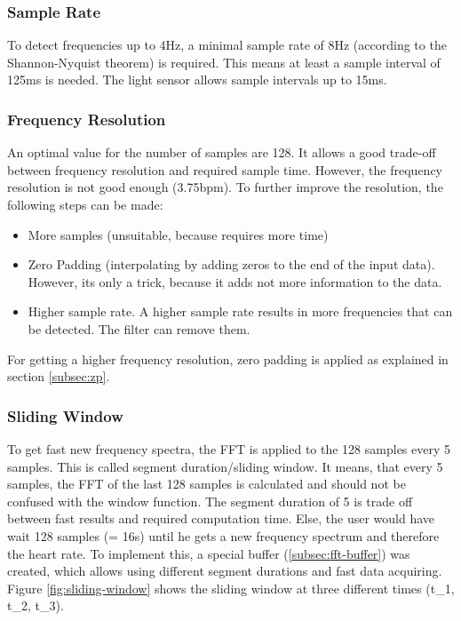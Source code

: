 \documentclass[notitlepage]{scrreprt}
\begin{document}
\subsubsection{Sample Rate}
To detect frequencies up to 4Hz, a minimal sample rate of 8Hz (according to the Shannon-Nyquist theorem) is required. This means at least a sample interval of 125ms is needed. The light sensor allows sample intervals up to 15ms.

\subsubsection{Frequency Resolution}
An optimal value for the number of samples are 128. It allows a good trade-off between frequency resolution and required sample time. However, the frequency resolution is not good enough (3.75bpm). To further improve the resolution, the following steps can be made:

\begin{itemize}
	\item{More samples (unsuitable, because requires more time)}
	\item{Zero Padding (interpolating by adding zeros to the end of the input data). However, its only a trick, because it adds not more information to the data.}
	\item{Higher sample rate. A higher sample rate results in more frequencies that can be detected. The filter can remove them.}
\end{itemize}

For getting a higher frequency resolution, zero padding is applied as explained in section \ref{subsec:zp}.

\subsubsection{Sliding Window}
\label{subsubsec:sliding-window}
To get fast new frequency spectra, the FFT is applied to the 128 samples every 5 samples. This is called segment duration/sliding window. It means, that every 5 samples, the FFT of the last 128 samples is calculated and should not be confused with the window function. The segment duration of 5 is trade off between fast results and required computation time. Else, the user would have wait 128 samples (= 16s) until he gets a new frequency spectrum and therefore the heart rate. To implement this, a special buffer (\ref{subsec:fft-buffer}) was created, which allows using different segment durations and fast data acquiring. Figure \ref{fig:sliding-window} shows the sliding window at three different times (t\_1, t\_2, t\_3).
\end{document}
